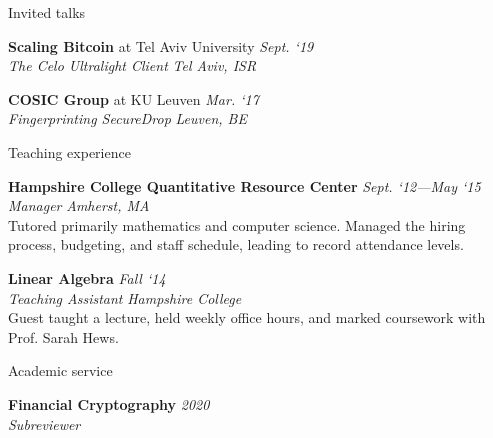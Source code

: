 \documentclass{cv}
\begin{document}
\begin{rSection}{Invited talks}

\textbf{Scaling Bitcoin} at Tel Aviv University \hfill \emph{Sept. `19} \\
\emph{The Celo Ultralight Client} \hfill \emph{Tel Aviv, ISR}

\textbf{COSIC Group} at KU Leuven \hfill \emph{Mar. `17} \\
\emph{Fingerprinting SecureDrop} \hfill \emph{Leuven, BE}

\end{rSection}

\begin{rSection}{Teaching experience}

\textbf{Hampshire College Quantitative Resource Center} \hfill \emph{Sept. `12---May `15} \\
\emph{Manager} \hfill \emph{Amherst, MA} \\
{\small Tutored primarily mathematics and computer science. Managed the hiring process, budgeting, and staff schedule, leading to record attendance levels.}

\textbf{Linear Algebra} \hfill \emph{Fall `14} \\
\emph{Teaching Assistant} \hfill \emph{Hampshire College} \\
{\small Guest taught a lecture, held weekly office hours, and marked coursework with Prof. Sarah Hews.}

\end{rSection}

\begin{rSection}{Academic service}

\textbf{Financial Cryptography} \hfill \emph{2020} \\
\emph{Subreviewer} \\

\end{rSection}

\end{document}
